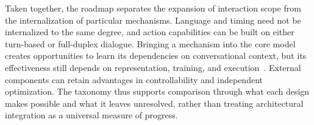 Taken together, the roadmap separates the expansion of interaction scope from the internalization of particular mechanisms. Language and timing need not be internalized to the same degree, and action capabilities can be built on either turn-based or full-duplex dialogue. Bringing a mechanism into the core model creates opportunities to learn its dependencies on conversational context, but its effectiveness still depends on representation, training, and execution~\cite{}. External components can retain advantages in controllability and independent optimization. The taxonomy thus supports comparison through what each design makes possible and what it leaves unresolved, rather than treating architectural integration as a universal measure of progress.


